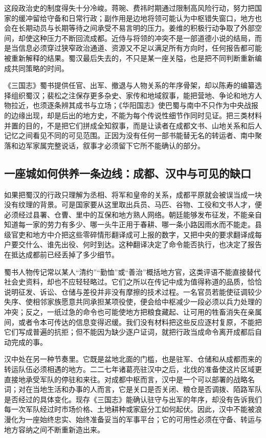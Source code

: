这段政治史的制度得失十分冷峻。蒋琬、费祎时期通过限制高风险行动，努力把国家的缓冲留给守备和日常行政；副作用是边地将领可能认为中枢错失窗口，地方也会在长期动员与长期等待之间承受不易言明的压力。姜维的积极行动争取了外部空间，却使这种压力不断回流成都。近侍与将领的冲突不是一部道德小说的结局，而是当信息必须穿过狭窄政治通道、资源又不足以满足所有方向时，任何报告都可能被重新解释的结果。蜀汉最后失去的，不只是某一座关隘，也是把不同判断重新编成共同策略的时间。

\begin{debate}
《三国志》蜀书提供任官、出军、撤退与人物关系的年序骨架，却以陈寿的编纂选择组织蜀汉；裴松之注保存更多杂史、家传和地域叙事，能把营地、争论和地方人物拉近，也须逐条辨其成书与立场；《华阳国志》使巴蜀与南中不只作为中央战报的边缘出现，却是后出的地方史，不能为每个传说性细节作同时见证。把三类材料并置的目的，不是把它们拼成全知叙事，而是让读者在成都文书、山地关系和后人记忆之间看见不同的可见范围。正因为没有任何一部书能替无名的转运者、南中聚落和边军家属完整说话，叙事才必须留下它所不能确认的部分。
\end{debate}
\subsection{一座城如何供养一条边线：成都、汉中与可见的缺口}

如果把蜀汉的行政只理解为丞相、将军和皇帝的关系，成都平原就会被误当成一块没有纹理的背景。可是国家要从这里取出兵员、马匹、谷物、工役和文书人才，便必须经过县署、仓曹、里中的互保和地方熟人网络。朝廷能够发布征发，不能亲自知道每一家的劳力有多少、哪一头牛正用于春耕、哪一条小路因雨水而不能走。县级官吏和地方中介把这些零碎情形翻译成可上报的数字，又把中央的要求翻译成每户要交什么、谁先出役、何时到达。这种翻译决定了命令能否执行，也决定了报告在抵达成都前已经丢掉了多少细节。

蜀书人物传记常以某人“清约”“勤恤”或“善治”概括地方官，这类评语不能直接替代社会史资料，却也不应轻轻略过。它们之所以在传记中成为值得称道的品质，恰恰说明征发、诉讼、仓储与差役并非没有摩擦的技术过程。一名官员若能使征调较少失序、使相邻家族愿意共同承担某项役使，便会给中枢减少一段必须以兵力处理的冲突；反之，一纸过急的命令也可能使地方把粮食藏起、让可用的牲畜消失在亲属间，或者令本可传达的信息变得迟缓。我们没有材料把这些反应逐村复原，不能把它们写成普遍的抗拒；但不能因为缺少逐户证词，就把行政当成命令离开成都后自动完成的事。

汉中处在另一种节奏里。它既是盆地北面的门槛，也是驻军、仓储和从成都而来的转运队伍必须相遇的地方。二二七年诸葛亮驻汉中之后，北伐的准备使这片区域更直接地承受军队的停驻和来往。对成都中枢而言，汉中是一个可以部署的战略名词；对在当地生活和办事的人而言，它是关口是否关闭、粮仓是否调拨、陌路军队是否经过的具体变化。现存《三国志》能确认驻守与出军的年序，却没有告诉我们每一次军队经过时市场价格、土地耕种或家庭分工如何起伏。因此，汉中不能被浪漫化为一座始终忠实、始终准备妥当的军事平台；它的可用性必须在守备、转运与地方容纳之间不断重新造出来。

